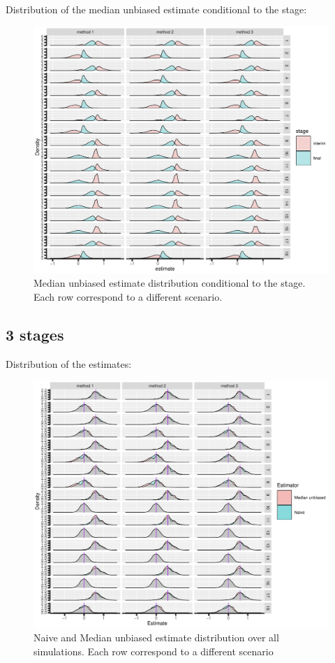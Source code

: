 \documentclass[12pt]{article}
\begin{document}
\clearpage

Distribution of the median unbiased estimate conditional to the stage:
\begin{figure}[!h]
\centering
\includegraphics[trim={0 0 0 0},width=1\textwidth]{./figures/gg2stage-estimateC-density.pdf}
\caption{Median unbiased estimate distribution conditional to the stage. Each row correspond to a different scenario.}
\end{figure}

\clearpage

\subsection{3 stages}
\label{sec:org2393c92}

Distribution of the estimates:
\begin{figure}[!h]
\centering
\includegraphics[trim={0 0 0 0},width=1\textwidth]{./figures/gg3stage-estimate-density.pdf}
\caption{Naive and Median unbiased estimate distribution over all simulations. Each row correspond to a different scenario}
\end{figure}
\end{document}

